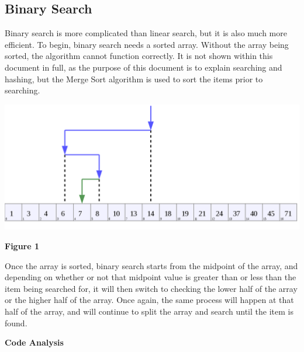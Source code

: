 \documentclass[letterpaper, 10pt]{article}
\begin{document}
\subsection{Binary Search}

Binary search is more complicated than linear search, but it is also much more efficient. To begin, binary search needs a sorted array. Without the array being sorted, the algorithm cannot function correctly. It is not shown within this document in full, as the purpose of this document is to explain searching and hashing, but the Merge Sort algorithm is used to sort the items prior to searching. 

\begin{center}
\includegraphics[width=\textwidth]{binSearch.png}
\end{center}
\textbf{Figure 1}

Once the array is sorted, binary search starts from the midpoint of the array, and depending on whether or not that midpoint value is greater than or less than the item being searched for, it will then switch to checking the lower half of the array or the higher half of the array. Once again, the same process will happen at that half of the array, and will continue to split the array and search until the item is found.
\newpage
\begin{center}
  \textbf{Code Analysis}  
\end{center}
\end{document}
